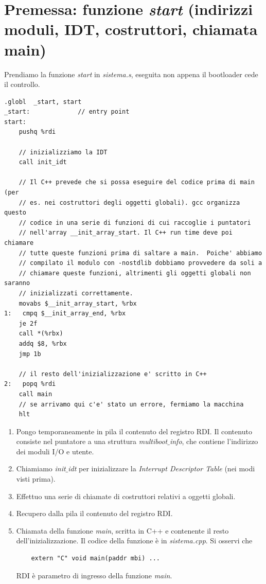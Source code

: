 \documentclass[11pt]{report}
\theoremstyle{definition}
\begin{document}
\section{Premessa: funzione \emph{start} (indirizzi moduli, IDT, costruttori, chiamata main)}
Prendiamo la funzione \emph{start} in \emph{sistema.s}, eseguita non appena il bootloader cede il controllo.
\small
\begin{verbatim}
.globl  _start, start
_start:				// entry point
start:
    pushq %rdi
    
    // inizializziamo la IDT
    call init_idt
    
    // Il C++ prevede che si possa eseguire del codice prima di main (per
    // es. nei costruttori degli oggetti globali). gcc organizza questo
    // codice in una serie di funzioni di cui raccoglie i puntatori
    // nell'array __init_array_start. Il C++ run time deve poi chiamare
    // tutte queste funzioni prima di saltare a main.  Poiche' abbiamo
    // compilato il modulo con -nostdlib dobbiamo provvedere da soli a
    // chiamare queste funzioni, altrimenti gli oggetti globali non saranno
    // inizializzati correttamente.
    movabs $__init_array_start, %rbx
1:	 cmpq $__init_array_end, %rbx
    je 2f
    call *(%rbx)
    addq $8, %rbx
    jmp 1b
    
    // il resto dell'inizializzazione e' scritto in C++
2:	 popq %rdi
    call main
    // se arrivamo qui c'e' stato un errore, fermiamo la macchina
    hlt
\end{verbatim}
\normalsize 
\begin{enumerate}
	\item Pongo temporaneamente in pila il contenuto del registro RDI. Il contenuto consiste nel puntatore a una struttura \emph{multiboot$\_$info}, che contiene l'indirizzo dei moduli I/O e utente. 
	\item Chiamiamo \emph{init$\_$idt} per inizializzare la \emph{Interrupt Descriptor Table} (nei modi visti prima).
	\item Effettuo una serie di chiamate di costruttori relativi a oggetti globali.
	\item Recupero dalla pila il contenuto del registro RDI.
	\item Chiamata della funzione \emph{main}, scritta in C++ e contenente il resto dell'inizializzazione. Il codice della funzione è in \emph{sistema.cpp}. Si osservi che
	\begin{verbatim}
	extern "C" void main(paddr mbi) ...
	\end{verbatim}
	RDI è parametro di ingresso della funzione \emph{main}.
\end{enumerate}
\end{document}
